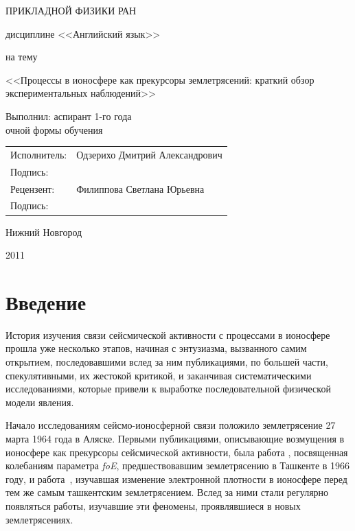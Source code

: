 \documentclass[12pt, oneside, a4paper]{article}
\begin{document}
\begin{titlepage}
\centerline{\large{} ПРИКЛАДНОЙ ФИЗИКИ РАН}
\vspace{3.0cm}
\centerline{\large{}}
\vspace{0.2cm}
\centerline{ дисциплине <<Английский язык>>}
\vspace{0.3cm}
\centerline{на тему}
\vspace{0.2cm}
\begin{center}
\large
<<Процессы в ионосфере как прекурсоры землетрясений: краткий обзор экспериментальных наблюдений>>
\vspace{1.0cm}
\begin{flushright}
\normalsize
Выполнил: аспирант 1-го года\\очной формы обучения 
\end{flushright}
\normalsize
\begin{flushright}
\begin{tabular}{>{\flushright}p{3.0cm}>{\flushleft}p{7.0cm}}
Исполнитель: & Одзерихо Дмитрий Александрович\tabularnewline
Подпись: &\tabularnewline
Рецензент: & Филиппова Светлана Юрьевна \tabularnewline
Подпись: &\tabularnewline
\end{tabular}
\end{flushright}
\vfill
\vspace{0.7cm}
\centerline{Нижний Новгород}
\centerline{2011}
\end{center}
\end{titlepage}
\tableofcontents
\newpage
\section{Введение}
История изучения связи сейсмической активности с процессами в ионосфере прошла уже несколько этапов, начиная с энтузиазма, вызванного самим открытием, последовавшими вслед за ним публикациями, по большей части, спекулятивными, их жестокой критикой, и заканчивая систематическими исследованиями, которые привели к выработке  последовательной физической модели явления. 

Начало исследованиям сейсмо-ионосферной связи положило землетрясение 27 марта 1964 года в Аляске. Первыми публикациями, описывающие возмущения в ионосфере как прекурсоры сейсмической активности, была работа \cite{Antselevich:1971}, посвященная колебаниям параметра \emph{foE}, предшествовавшим землетрясению в Ташкенте в 1966 году, и работа~\cite{Datchenko:1972}, изучавшая изменение электронной плотности в ионосфере перед тем же самым ташкентским землетрясением. Вслед за ними стали регулярно появляться работы, изучавшие эти феномены, проявлявшиеся в новых землетрясениях. 
\end{document}
